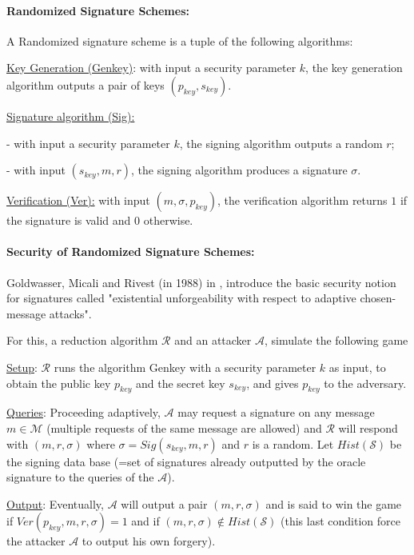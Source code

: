 \documentclass[a4paper,11pt]{article}
\begin{document}
\paragraph{Randomized Signature Schemes:}

A Randomized signature scheme is a tuple of the following algorithms:

\underline{Key Generation (Genkey)}: with input a security parameter $k$, the key generation algorithm outputs a pair of keys $(p_{key}, s_{key})$.


\underline{Signature algorithm (Sig):}

- with input a security parameter $k$, the signing algorithm outputs a random $r$;

- with input $(s_{key}, m,r)$, the signing algorithm  produces a signature $\sigma$.

\underline{Verification (Ver):}  with input $(m, \sigma, p_{key})$, the verification algorithm returns $1$ if the signature is valid and $0$ otherwise.

\paragraph{Security of Randomized Signature Schemes:}

Goldwasser, Micali and Rivest (in 1988)  in \cite{Goldwasser}, introduce the basic security notion for signatures called "existential unforgeability with respect to adaptive chosen-message attacks".

For this, a reduction algorithm $\mathcal{R}$ and an attacker $\mathcal{A}$, simulate the following game

\underline{Setup}: $\mathcal{R}$ runs the algorithm Genkey with a security parameter $k$ as input, to obtain the public key $p_{key}$ and the secret key $s_{key}$, and gives $p_{key}$ to the adversary.

\underline{Queries}: Proceeding adaptively, $\mathcal{A}$ may request a signature on any message  $m \in  \mathcal{M}$
 (multiple requests of the same message are allowed) and $\mathcal{R}$ will respond with $(m, r,  \sigma)$ where $\sigma= Sig(s_{key}, m, r)$ and $r$ is a random. Let $Hist(\mathcal{S})$ be the signing data base (=set of signatures already outputted by the oracle signature to the queries of the  $\mathcal{A}$).

\underline{Output}: Eventually, $\mathcal{A}$ will output a pair $(m, r,  \sigma)$ and is said to win the game
 if $Ver(p_{key}, m, r, \sigma)=1$ and if $ (m, r,  \sigma) \notin Hist(\mathcal{S})$ (this last condition force the attacker $\mathcal{A}$ to output his own forgery).
\end{document}
